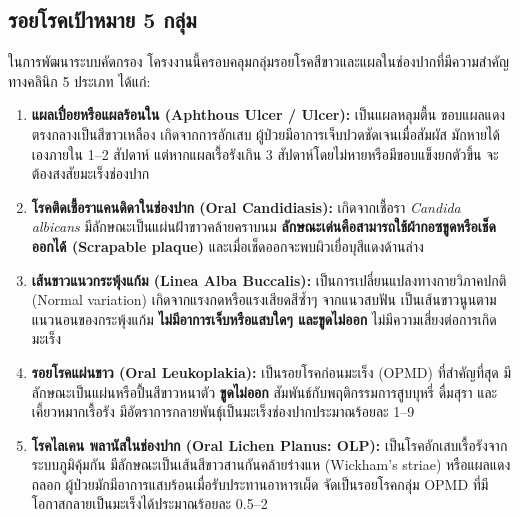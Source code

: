 \subsection{รอยโรคเป้าหมาย 5 กลุ่ม}
ในการพัฒนาระบบคัดกรอง โครงงานนี้ครอบคลุมกลุ่มรอยโรคสีขาวและแผลในช่องปากที่มีความสำคัญทางคลินิก 5 ประเภท ได้แก่:
\begin{enumerate}
    \item \textbf{แผลเปื่อยหรือแผลร้อนใน (Aphthous Ulcer / Ulcer):} เป็นแผลหลุมตื้น ขอบแผลแดง ตรงกลางเป็นสีขาวเหลือง เกิดจากการอักเสบ ผู้ป่วยมีอาการเจ็บปวดชัดเจนเมื่อสัมผัส มักหายได้เองภายใน 1--2 สัปดาห์ แต่หากแผลเรื้อรังเกิน 3 สัปดาห์โดยไม่หายหรือมีขอบแข็งยกตัวขึ้น จะต้องสงสัยมะเร็งช่องปาก
    \item \textbf{โรคติดเชื้อราแคนดิดาในช่องปาก (Oral Candidiasis):} เกิดจากเชื้อรา \textit{Candida albicans} มีลักษณะเป็นแผ่นฝ้าขาวคล้ายคราบนม \textbf{ลักษณะเด่นคือสามารถใช้ผ้ากอซขูดหรือเช็ดออกได้ (Scrapable plaque)} และเมื่อเช็ดออกจะพบผิวเยื่อบุสีแดงด้านล่าง
    \item \textbf{เส้นขาวแนวกระพุ้งแก้ม (Linea Alba Buccalis):} เป็นการเปลี่ยนแปลงทางกายวิภาคปกติ (Normal variation) เกิดจากแรงกดหรือแรงเสียดสีซ้ำๆ จากแนวสบฟัน เป็นเส้นขาวนูนตามแนวนอนของกระพุ้งแก้ม \textbf{ไม่มีอาการเจ็บหรือแสบใดๆ และขูดไม่ออก} ไม่มีความเสี่ยงต่อการเกิดมะเร็ง
    \item \textbf{รอยโรคแผ่นขาว (Oral Leukoplakia):} เป็นรอยโรคก่อนมะเร็ง (OPMD) ที่สำคัญที่สุด มีลักษณะเป็นแผ่นหรือปื้นสีขาวหนาตัว \textbf{ขูดไม่ออก} สัมพันธ์กับพฤติกรรมการสูบบุหรี่ ดื่มสุรา และเคี้ยวหมากเรื้อรัง มีอัตราการกลายพันธุ์เป็นมะเร็งช่องปากประมาณร้อยละ 1--9
    \item \textbf{โรคไลเคน พลานัสในช่องปาก (Oral Lichen Planus: OLP):} เป็นโรคอักเสบเรื้อรังจากระบบภูมิคุ้มกัน มีลักษณะเป็นเส้นสีขาวสานกันคล้ายร่างแห (Wickham's striae) หรือแผลแดงถลอก ผู้ป่วยมักมีอาการแสบร้อนเมื่อรับประทานอาหารเผ็ด จัดเป็นรอยโรคกลุ่ม OPMD ที่มีโอกาสกลายเป็นมะเร็งได้ประมาณร้อยละ 0.5--2
\end{enumerate}

